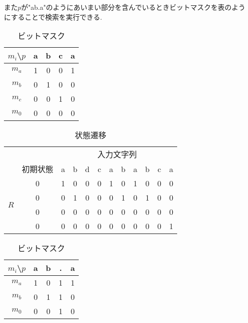 また$p$が"ab.a"のようにあいまい部分を含んでいるときビットマスクを表のようにすることで検索を実行できる.
\begin{table}[h]
\caption{ビットマスク}
\label{tab:bitmask}
\centering
\begin{tabular}{ccccc}
$m_i${\textbackslash}$p$&a&b&c&a\\
\hline \hline
$m_a$&1&0&0&1\\
$m_b$&0&1&0&0\\
$m_c$&0&0&1&0\\
$m_0$&0&0&0&0\\
\end{tabular}
\end{table}
\begin{table}[h]
\caption{状態遷移}
\label{tab:seni}
\centering
\begin{tabular}{c|ccccccccccc}
&&\multicolumn{10}{c}{入力文字列}\\
&初期状態&a&b&d&c&a&b&a&b&c&a\\
\hline \hline
\multirow{4}{*}{$R$}&0&1&0&0&0&1&0&1&0&0&0\\
&0&0&1&0&0&0&1&0&1&0&0\\
&0&0&0&0&0&0&0&0&0&0&0\\
&0&0&0&0&0&0&0&0&0&0&1
\end{tabular}
\end{table}
\begin{table}[h]
  \caption{ビットマスク}
  \label{tab:bitmask}
  \centering
  \begin{tabular}{ccccc}
  $m_i${\textbackslash}$p$&a&b&.&a\\
  \hline \hline
  $m_a$&1&0&1&1\\
  $m_b$&0&1&1&0\\
  $m_0$&0&0&1&0\\
  \end{tabular}
  \end{table}